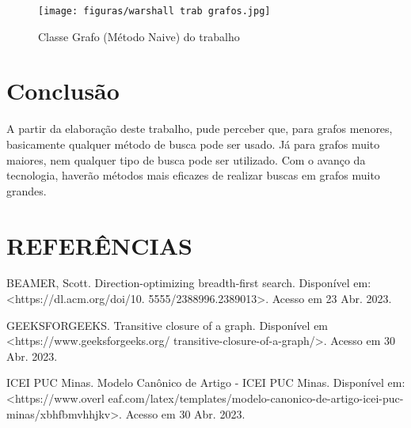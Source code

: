 \begin{figure}[!ht]
	\centering	
	\caption[\hspace{0.1cm}Exemplo de tela de software.]{Classe Grafo (Método Naive) do trabalho}
	  \vspace{-0.4cm}
	\texttt{[image: figuras/warshall trab grafos.jpg]}
\end{figure}

\newpage
\vspace{\baselineskip}

\section{\esp Conclusão}

A partir da elaboração deste trabalho, pude perceber que, para grafos menores, basicamente qualquer método de busca pode ser usado. Já para grafos muito maiores, nem qualquer tipo de busca pode ser utilizado. Com o avanço da tecnologia, haverão métodos mais eficazes de realizar buscas em grafos muito grandes.


 \newpage
\section{\esp REFERÊNCIAS}

BEAMER, Scott. Direction-optimizing breadth-first search. Disponível em: <https://dl.acm.org/doi/10.
5555/2388996.2389013>. Acesso em 23 Abr. 2023.

\vspace{\baselineskip}

GEEKSFORGEEKS. Transitive closure of a graph. Disponível em <https://www.geeksforgeeks.org/
transitive-closure-of-a-graph/>. Acesso em 30 Abr. 2023.

\vspace{\baselineskip}

ICEI PUC Minas. Modelo Canônico de Artigo - ICEI PUC Minas. Disponível em: <https://www.overl
eaf.com/latex/templates/modelo-canonico-de-artigo-icei-puc-minas/xbhfbmvhhjkv>. Acesso em 30 Abr. 2023.

\vspace{\baselineskip}

